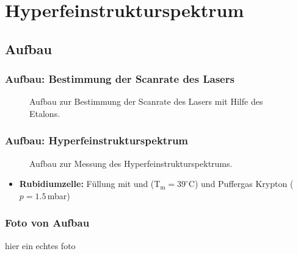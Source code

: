 
\section{Hyperfeinstrukturspektrum}
\subsection{Aufbau}


\begin{frame}
\frametitle{Aufbau: Bestimmung der Scanrate des Lasers}

\begin{figure}
    \centering
    \def\svgwidth{\textwidth}
    
    \caption{Aufbau zur Bestimmung der Scanrate des Lasers mit Hilfe des Etalons.}
\end{figure}
\end{frame}


\begin{frame}
\frametitle{Aufbau: Hyperfeinstrukturspektrum}
\begin{figure}
    \centering
    \def\svgwidth{\textwidth}
    
    \caption{Aufbau zur Messung des Hyperfeinstrukturspektrums.}
\end{figure}
\begin{itemize}
  \item \textbf{Rubidiumzelle:} Füllung mit  und  (T$_\text{m}=39^\circ$C)
  und Puffergas Krypton ($p=1.5$\,mbar)
\end{itemize}
\end{frame}


\begin{frame}
\frametitle{Foto von Aufbau}
hier ein echtes foto
\end{frame}


